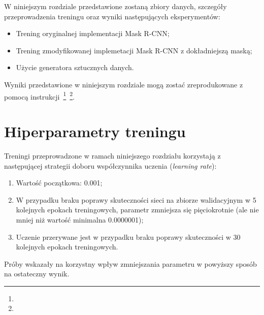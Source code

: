 
W niniejszym rozdziale przedstawione zostaną zbiory danych, szczegóły przeprowadzenia treningu oraz wyniki następujących eksperymentów:

\begin{itemize}
 \item Trening oryginalnej implementacji Mask R-CNN;
 \item Trening zmodyfikowanej implemetacji Mask R-CNN z dokładniejszą maską;
 \item Użycie generatora sztucznych danych.
\end{itemize}

Wyniki przedstawione w niniejszym rozdziale mogą zostać zreprodukowane z pomocą instrukcji~\footnote{}~\footnote{}.

\section{Hiperparametry treningu}

Treningi przeprowadzone w ramach niniejszego rozdziału korzystają z następującej strategii doboru współczynnika uczenia (\textit{learning rate}):
\begin{enumerate}
  \item Wartość początkowa: 0.001;
  \item W przypadku braku poprawy skuteczności sieci na zbiorze walidacyjnym w 5 kolejnych epokach treningowych, parametr zmniejsza się pięciokrotnie (ale nie mniej niż wartość minimalna 0.0000001);
  \item Uczenie przerywane jest w przypadku braku poprawy skuteczności w 30 kolejnych epokach treningowych.
\end{enumerate}

Próby wskazały na korzystny wpływ zmniejszania parametru w powyższy sposób na ostateczny wynik.
